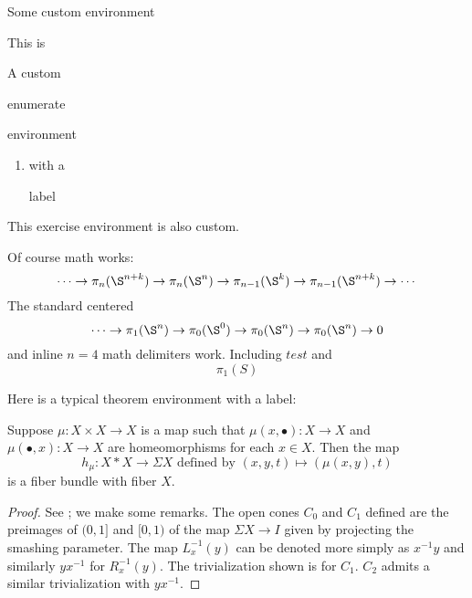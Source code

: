 \documentclass{amsart}
\begin{document}
\begin{preliminary}
    Some custom environment
\end{preliminary}
\begin{exercise}
    \begin{ecomponents}
        \item This is
        \item A custom
        \begin{ecomponents}
            \item enumerate
            \item environment
            \begin{enumerate}
                \item with a
                \item[label]
            \end{enumerate}
        \end{ecomponents}
    \end{ecomponents}
    This exercise environment is also custom.
\end{exercise}
Of course math works:
\begin{equation}\label{eq:1}
    \cdots\to \pi_{n}(\S^{n+k})\to \pi_n(\S^n)\to \pi_{n-1}(\S^k)\to\pi_{n-1}(\S^{n+k})\to\cdots
\end{equation}
The standard centered
$$
    \cdots\to \pi_1(\S^n)\to \pi_{0}(\S^0)\to\pi_{0}(\S^{n})\to\pi_{0}(\S^{n})\to 0
$$
and inline $n=4$ math delimiters work. Including \(test\) and
\[\pi_1(S)\]

Here is a typical theorem environment with a label:
\begin{proposition}
Suppose $\mu:X\times X\to X$ is a map such that $\mu(x,\bullet):X\to X$ and $\mu(\bullet,x):X\to X$ are homeomorphisms for each $x\in X$. Then the map
$$
    h_{\mu}:X*X\to \Sigma X\mbox{ defined by }(x,y,t)\mapsto (\mu(x,y),t)
$$
is a fiber bundle with fiber $X$.
\end{proposition}
\begin{proof}
    See \cite[Proposition VII.8.8]{Bredon1993}; we make some remarks. The open cones $C_0$ and $C_1$ defined are the preimages of $(0,1]$ and $[0,1)$ of the map $\Sigma X\to I$ given by projecting the smashing parameter. The map $L_x^{-1}(y)$ can be denoted more simply as $x^{-1}y$ and similarly $yx^{-1}$ for $R_x^{-1}(y)$. The trivialization shown is for $C_1$. $C_2$ admits a similar trivialization with $yx^{-1}$.
\end{proof}
\end{document}
